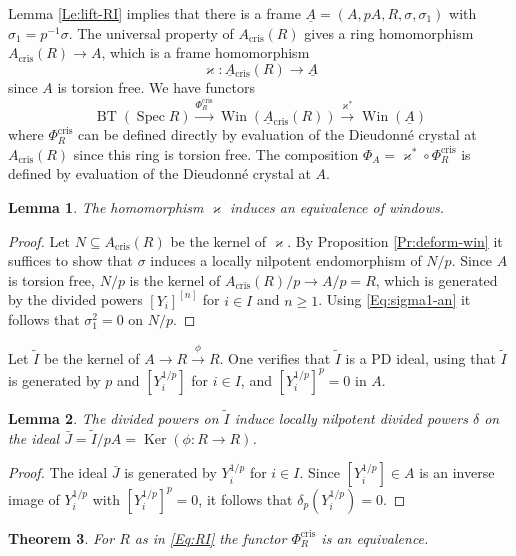 \documentclass[a4paper,11pt]{article}
\theoremstyle{plain}
\newtheorem{Lemma}{Lemma}
\newtheorem{Thm}[Lemma]{Theorem}
\theoremstyle{definition}
\theoremstyle{remark}
\theoremstyle{definition}
\numberwithin{Lemma}{section}
\numberwithin{Subpoint}{Lemma}
\numberwithin{equation}{section}
\DeclareMathOperator{\BT}{BT}
\DeclareMathOperator{\Ker}{Ker}
\DeclareMathOperator{\Spec}{Spec}
\DeclareMathOperator{\Win}{Win}
\DeclareMathOperator{\cris}{cris}
\renewcommand{\u}{\underline}
\newcommand{\chang}[1]{{#1}}
\begin{document}
Lemma \ref{Le:lift-RI} implies that there is a frame
$
\u A=(A,pA,R,\sigma,\sigma_1)
$
with $\sigma_1=p^{-1}\sigma$.
The universal property of $A_{\cris}(R)$ gives a ring homomorphism
$A_{\cris}(R)\to A$, which is a frame homomorphism 
\[
\varkappa:\u A{}_{\cris}(R)\to\u A
\]
since $A$ is torsion free.
We have functors
\[
\BT(\Spec R)
\xrightarrow{\Phi_R^{\cris}}
\Win(\u A{}_{\cris}(R))
\xrightarrow{\varkappa^*}
\Win(\u A)
\]
where $\Phi_R^{\cris}$ can be defined directly by evaluation of the
Dieudonn\'e crystal at $A_{\cris}(R)$ 
since this ring is torsion free.
The composition $\Phi_A=\varkappa^*\circ\Phi_R^{\cris}$
is defined by evaluation of the Dieudonn\'e crystal at $A$.

\begin{Lemma}
\label{Le:varkappa-RI} 
The homomorphism $\varkappa$ induces an equivalence of windows.
\end{Lemma}

\begin{proof}
Let $N\subseteq A_{\cris}(R)$ be the kernel of $\varkappa$.
By Proposition \ref{Pr:deform-win} it suffices to show
that $\sigma$ induces a \chang{locally} nilpotent endomorphism of $N/p$.
Since $A$ is torsion free, 
$N/p$ is the kernel of $A_{\cris}(R)/p\to A/p=R$,
which is generated by the divided powers
$[Y_i]^{[n]}$ for $i\in I$ and $n\ge 1$.
Using \eqref{Eq:sigma1-an} it follows that $\sigma_1^2=0$ on $N/p$.
\end{proof}

Let $\tilde I$ be the kernel of $A\to R\xrightarrow\phi R$.
One verifies that $\tilde I$ is a PD ideal,
using that $\tilde I$ is generated by $p$ and $[Y_i^{1/p}]$ for $i\in I$,
and $[Y_i^{1/p}]^p=0$ in $A$.

\begin{Lemma}
\label{Le:PD-tI}
The divided powers on $\tilde I$ induce \chang{locally} nilpotent
divided powers $\delta$ on the ideal 
$\bar J=\tilde I/pA=\Ker(\phi:R\to R)$.
\end{Lemma}

\begin{proof}
The ideal $\bar J$ is generated by $Y_i^{1/p}$ for $i\in I$.
Since $[Y_i^{1/p}]\in A$ is an inverse image of \chang{$Y_i^{1/p}$} with $[Y_i^{1/p}]^p=0$,
it follows that $\delta_p(Y_i^{1/p})=0$.
\end{proof}

\begin{Thm}
\label{Th:semiperfect-RI}
For $R$ as in \eqref{Eq:RI} the functor $\Phi_R^{\cris}$ is an equivalence.
\end{Thm}
\end{document}
